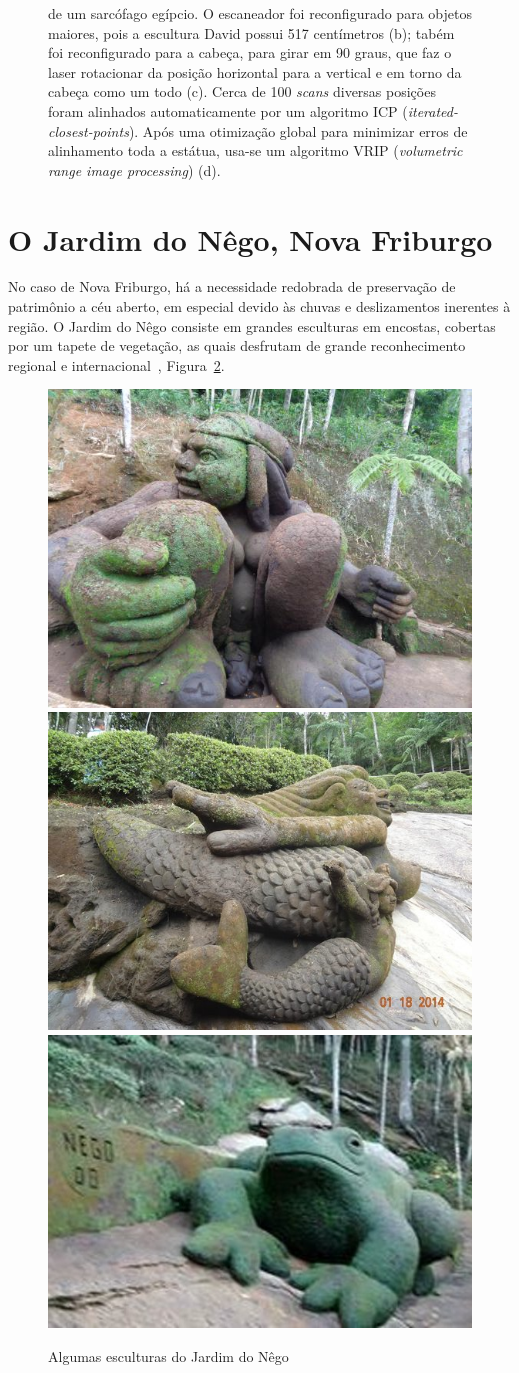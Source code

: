 \begin{figure}[!h]
{   de um sarcófago egípcio. O escaneador foi reconfigurado para objetos maiores, pois 
   a escultura David possui 517 centímetros (b); tabém foi reconfigurado para a cabeça,  
   para girar em 90 graus, que faz o laser
   rotacionar da posição horizontal para a vertical e em torno da
   cabeça como um todo (c). Cerca de 100 \emph{scans}
   diversas posições foram alinhados automaticamente por um algoritmo 
   ICP (\emph{iterated-closest-points}). Após uma otimização global para minimizar erros 
   de alinhamento toda a estátua, usa-se um algoritmo VRIP (\emph {volumetric
   range image processing}) (d)}.
  \label{fig:david}
\end{figure}

\section{O Jardim do Nêgo, Nova Friburgo}
No caso de Nova Friburgo, há a necessidade redobrada de preservação de
patrimônio a céu aberto, em especial devido às chuvas e deslizamentos inerentes à região.  O
Jardim do Nêgo consiste em grandes esculturas em encostas, cobertas por um tapete de
vegetação, as quais desfrutam de grande reconhecimento regional e internacional~\cite{JardimDoNego:TheGuardian},
Figura~\ref{fig:esculturas}.

\begin{figure} [!h]
	\centering
  \caption{Algumas esculturas do Jardim do Nêgo}
	\includegraphics[height=0.23\linewidth]{figs/jardim-do-nego.jpg}
	\includegraphics[height=0.23\linewidth]{figs/jardim-do-nego22.jpg}
	\includegraphics[height=0.23\linewidth]{figs/jardim-do-nego32-small.jpg}
  \label{fig:esculturas}
\end{figure}


